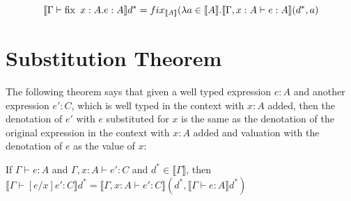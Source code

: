 \[\llbracket \Gamma \vdash \operatorname{fix} \ x : A. e : A \rrbracket d^* = fix_{\llbracket A \rrbracket} (\lambda a \in \llbracket A \rrbracket . \llbracket \Gamma, x : A \vdash e : A \rrbracket(d^*, a)\] 

\section{Substitution Theorem}
The following theorem says that given a well typed expression $e : A$ and another expression $e' : C$, which is well typed in the context with $x:A$ added, then the denotation of $e'$ with $e$ substituted for $x$ is the same as the denotation of the original expression in the context with $x:A$ added and valuation with the denotation of $e$ as the value of $x$:

\vspace{0.5cm}

\begin{thm}
If $\Gamma \vdash e : A$ and $\Gamma, x:A \vdash e' : C$ and $d^* \in \llbracket \Gamma \rrbracket$, then $\llbracket \Gamma \vdash [e/x]e' : C \rrbracket d^* =\llbracket \Gamma, x : A \vdash e': C \rrbracket (d^*, \llbracket \Gamma \vdash e : A \rrbracket d^*)$
\end{thm}

